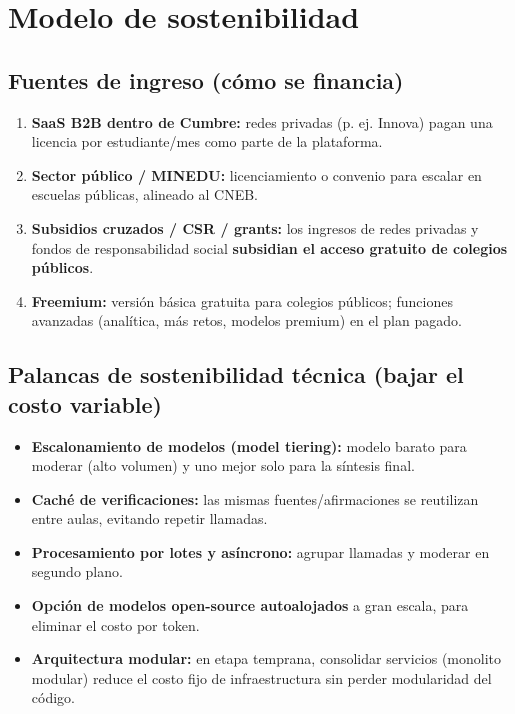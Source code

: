 \documentclass[11pt,a4paper]{article}
\begin{document}
\section{Modelo de sostenibilidad}

\subsection{Fuentes de ingreso (c\'omo se financia)}
\begin{enumerate}[leftmargin=*]
  \item \textbf{SaaS B2B dentro de Cumbre:} redes privadas (p. ej. Innova) pagan una licencia por estudiante/mes como parte de la plataforma.
  \item \textbf{Sector p\'ublico / MINEDU:} licenciamiento o convenio para escalar en escuelas p\'ublicas, alineado al CNEB.
  \item \textbf{Subsidios cruzados / CSR / grants:} los ingresos de redes privadas y fondos de responsabilidad social \textbf{subsidian el acceso gratuito de colegios p\'ublicos}.
  \item \textbf{Freemium:} versi\'on b\'asica gratuita para colegios p\'ublicos; funciones avanzadas (anal\'itica, m\'as retos, modelos premium) en el plan pagado.
\end{enumerate}

\subsection{Palancas de sostenibilidad t\'ecnica (bajar el costo variable)}
\begin{itemize}[leftmargin=*]
  \item \textbf{Escalonamiento de modelos (model tiering):} modelo barato para moderar (alto volumen) y uno mejor solo para la s\'intesis final.
  \item \textbf{Cach\'e de verificaciones:} las mismas fuentes/afirmaciones se reutilizan entre aulas, evitando repetir llamadas.
  \item \textbf{Procesamiento por lotes y as\'incrono:} agrupar llamadas y moderar en segundo plano.
  \item \textbf{Opci\'on de modelos open-source autoalojados} a gran escala, para eliminar el costo por token.
  \item \textbf{Arquitectura modular:} en etapa temprana, consolidar servicios (monolito modular) reduce el costo fijo de infraestructura sin perder modularidad del c\'odigo.
\end{itemize}
\end{document}
